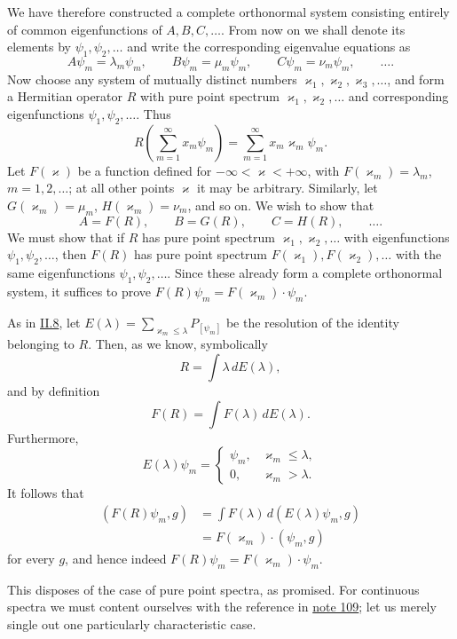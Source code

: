 \documentclass[fontsize=13pt,twoside,openany,headings=normal,parskip=false,bookmarkpackage=false,DIV=calc]{scrbook}
\begin{document}
\hypertarget{origpage-92}{}%
We have therefore constructed a complete orthonormal system consisting entirely of common eigenfunctions of $A,B,C,\ldots$. From now on we shall denote its elements by $\psi_1,\psi_2,\ldots$ and write the corresponding eigenvalue equations as
\[
A\psi_m=\lambda_m\psi_m,\qquad
B\psi_m=\mu_m\psi_m,\qquad
C\psi_m=\nu_m\psi_m,\qquad\ldots.
\]
Now choose any system of mutually distinct numbers $\varkappa_1,\varkappa_2,\varkappa_3,\ldots$, and form a Hermitian operator $R$ with pure point spectrum $\varkappa_1,\varkappa_2,\ldots$ and corresponding eigenfunctions $\psi_1,\psi_2,\ldots$. Thus
\[
R\left(\sum_{m=1}^\infty x_m\psi_m\right)
=\sum_{m=1}^\infty x_m\varkappa_m\psi_m.
\]
Let $F(\varkappa)$ be a function defined for $-\infty<\varkappa<+\infty$, with $F(\varkappa_m)=\lambda_m$, $m=1,2,\ldots$; at all other points $\varkappa$ it may be arbitrary. Similarly, let $G(\varkappa_m)=\mu_m$, $H(\varkappa_m)=\nu_m$, and so on. We wish to show that
\[
A=F(R),\qquad B=G(R),\qquad C=H(R),\qquad\ldots.
\]
We must show that if $R$ has pure point spectrum $\varkappa_1,\varkappa_2,\ldots$ with eigenfunctions $\psi_1,\psi_2,\ldots$, then $F(R)$ has pure point spectrum $F(\varkappa_1),F(\varkappa_2),\ldots$ with the same eigenfunctions $\psi_1,\psi_2,\ldots$. Since these already form a complete orthonormal system, it suffices to prove $F(R)\psi_m=F(\varkappa_m)\cdot\psi_m$.

As in \hyperref[sec:II.8]{II.8}, let $E(\lambda)=\sum_{\varkappa_m\leq\lambda}P_{[\psi_m]}$ be the resolution of the identity belonging to $R$. Then, as we know, symbolically
\[
R=\int\lambda\,dE(\lambda),
\]
and by definition
\[
F(R)=\int F(\lambda)\,dE(\lambda).
\]
Furthermore,
\[
E(\lambda)\psi_m=\begin{cases}\psi_m,&\varkappa_m\leq\lambda,\\0,&\varkappa_m>\lambda.\end{cases}
\]
It follows that
\begin{align*}
(F(R)\psi_m,g)&=\int F(\lambda)\,d(E(\lambda)\psi_m,g)\\
&=F(\varkappa_m)\cdot(\psi_m,g)
\end{align*}
for every $g$, and hence indeed $F(R)\psi_m=F(\varkappa_m)\cdot\psi_m$.

This disposes of the case of pure point spectra, as promised. For continuous spectra we must content ourselves with the reference in \hyperlink{note-109}{note 109}; let us merely single out one particularly characteristic case.
\end{document}
